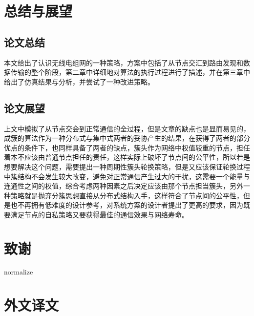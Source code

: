 \documentclass[a4paper,AutoFakeBold,oneside,12pt]{book}
\begin{document}
  \chapter{总结与展望}
\section{论文总结}
  本文给出了认识无线电组网的一种策略，方案中包括了从节点交汇到路由发现和数据传输的整个阶段，第二章中详细地对算法的执行过程进行了描述，并在第三章中给出了仿真结果与分析，并尝试了一种改进策略。
 \section{论文展望}
  上文中模拟了从节点交会到正常通信的全过程，但是文章的缺点也是显而易见的，成簇的算法作为一种分布式与集中式两者的妥协产生的结果，在获得了两者的部分优点的条件下，也同样具备了两者的缺点，簇头作为网络中权值较重的节点，担任着本不应该由普通节点担任的责任，这样实际上破坏了节点间的公平性，所以若是想要解决这个问题，需要提出一种周期性簇头轮换策略，但是又应该保证轮换过程中簇结构不会发生较大改变，避免对正常通信产生过大的干扰，这需要一个能量与连通性之间的权值，综合考虑两种因素之后决定应该由那个节点担当簇头，另外一种策略就是抛弃分簇思想直接从分布式结构入手，这样符合了节点间的公平性，但是也不再拥有低难度的设计参考，对系统方案的设计者提出了更高的要求，因为既要满足节点的自私策略又要获得最佳的通信效果与网络寿命。
\clearpage{}


\clearpage{}
\chapter*{致\qquad{}谢}
  normalize

\newpage\backmatter
\chapter*{外\quad{}文\quad{}译\quad{}文}
\vspace{8mm}

\thispagestyle{empty}

\begin{center}
\sihao{}

\xiaosihao{}

\xiaosihao{}
\end{center}
\end{document}
